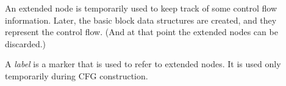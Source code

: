 An extended node is temporarily used to keep track of some control flow
information.  Later, the basic block data structures are created, and they
represent the control flow.  (And at that point the extended nodes can be
discarded.)
\begin{definition}[Label]
    A \emph{label} is a marker that is used to refer to extended nodes. It is used only temporarily during CFG construction.
\end{definition}



